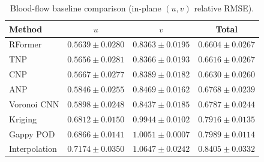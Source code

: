 \begin{table}[t]
  \centering
  \caption{Blood-flow baseline comparison (in-plane $(u,v)$ relative RMSE).}
  \label{tab:rformer:blood}
  \begin{tabular}{lccc}
    \toprule
    Method & $u$ & $v$ & Total \\
    \midrule
    RFormer       & $0.5639 \pm 0.0280$ & $0.8363 \pm 0.0195$ & $\mathbf{0.6604 \pm 0.0267}$ \\
    TNP           & $0.5656 \pm 0.0281$ & $0.8366 \pm 0.0193$ & $0.6616 \pm 0.0267$ \\
    CNP           & $0.5667 \pm 0.0277$ & $0.8389 \pm 0.0182$ & $0.6630 \pm 0.0260$ \\
    ANP           & $0.5846 \pm 0.0255$ & $0.8469 \pm 0.0162$ & $0.6768 \pm 0.0239$ \\
    Voronoi CNN   & $0.5898 \pm 0.0248$ & $0.8437 \pm 0.0185$ & $0.6787 \pm 0.0244$ \\
    Kriging       & $0.6812 \pm 0.0150$ & $0.9944 \pm 0.0102$ & $0.7916 \pm 0.0135$ \\
    Gappy POD     & $0.6866 \pm 0.0141$ & $1.0051 \pm 0.0007$ & $0.7989 \pm 0.0114$ \\
    Interpolation & $0.7174 \pm 0.0350$ & $1.0647 \pm 0.0242$ & $0.8405 \pm 0.0332$ \\
    \bottomrule
  \end{tabular}
\end{table}
